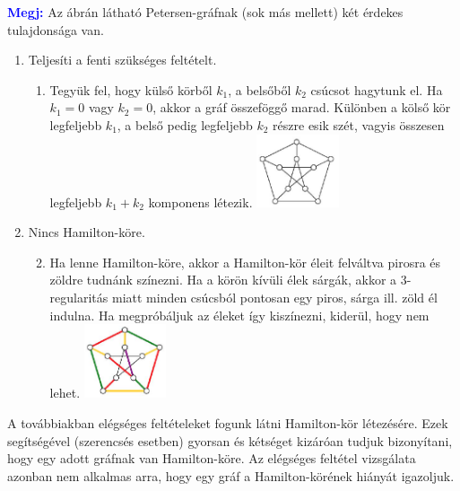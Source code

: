 \documentclass[../szamtud.tex]{subfiles}
\begin{document}
        \textcolor{blue}{\textbf{Megj:}} Az ábrán látható Petersen-gráfnak (sok más mellett) két érdekes tulajdonsága van. 

            \begin{enumerate}
                \item Teljesíti a fenti szükséges feltételt. 
                    \begin{enumerate}
                        \item Tegyük fel, hogy külső körből $k_1$, a belsőből $k_2$ csúcsot hagytunk el. Ha $k_1 = 0$ vagy $k_2 = 0$, akkor a gráf összeföggő marad. Különben a kölső kör legfeljebb $k_1$, a belső pedig legfeljebb $k_2$ részre esik szét, vagyis összesen legfeljebb $k_1 + k_2$ komponens létezik. \includegraphics[width=0.2\textwidth]{./img/5.png}
                    \end{enumerate}
                \item Nincs Hamilton-köre.
                    \begin{enumerate}
                        \setcounter{enumi}{1}
                        \item Ha lenne Hamilton-köre, akkor a Hamilton-kör éleit felváltva pirosra és zöldre tudnánk színezni. Ha a körön kívüli élek sárgák, akkor a 3-regularitás miatt minden csúcsból pontosan egy piros, sárga ill. zöld él indulna. Ha megpróbáljuk az éleket így kiszínezni, kiderül, hogy nem lehet. \includegraphics[width=0.2\textwidth]{./img/6.png}
                    \end{enumerate}
            \end{enumerate}
        
        A továbbiakban elégséges feltételeket fogunk látni Hamilton-kör létezésére. Ezek segítségével (szerencsés esetben) gyorsan és kétséget kizáróan tudjuk bizonyítani, hogy egy adott gráfnak van Hamilton-köre. Az elégséges feltétel vizsgálata azonban nem alkalmas arra, hogy egy gráf a Hamilton-körének hiányát igazoljuk.
\end{document}
